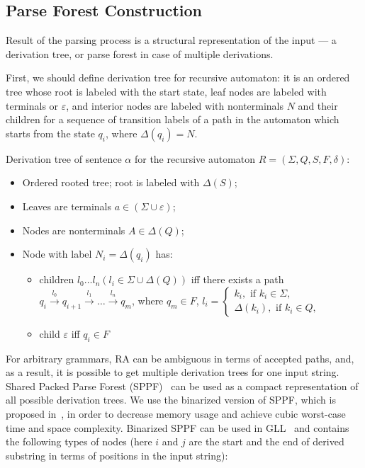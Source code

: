 \documentclass[runningheads,a4paper]{llncs}
\begin{document}
\subsection{Parse Forest Construction}

Result of the parsing process is a structural representation of the input --- a derivation tree, or parse forest in case of multiple derivations.

First, we should define derivation tree for recursive automaton: it is an ordered tree whose root is labeled with the start state,
leaf nodes are labeled with terminals or $\varepsilon$, and interior nodes are labeled with  nonterminals $N$ and their children for a sequence of transition labels of a path in the
automaton which starts from the state $q_i$, where $ \Delta(q_i) = N $.

\begin{mydef}

Derivation tree of sentence $\alpha$ for the recursive automaton $R=(\Sigma, Q, S, F, \delta)$:%

\begin{itemize}
    \item Ordered rooted tree; root is labeled with $\Delta(S)$;
    \item Leaves are terminals $a\in (\Sigma \cup \varepsilon)$;
    \item Nodes are nonterminals $A\in \Delta(Q)$;
    \item Node with label $N_i = \Delta(q_i)$ has:
    \begin{itemize}
        \item 
            children $l_0 \dots l_n (l_i \in \Sigma \cup \Delta(Q))$ iff there exists a
            path $q_i \xrightarrow[]{l_0} q_{i+1} \xrightarrow[]{l_1} \dots \xrightarrow{l_n} q_m$, where
            $q_m \in F$, $l_i = 
            \left\{
            \begin{matrix}
            k_i, \text{ if }  k_i \in \Sigma,\\
            \Delta(k_i), \text{ if } k_i \in Q,
            \end{matrix}
            \right.
            $
        \item child $\varepsilon$ iff $ q_i \in F $
    \end{itemize}
\end{itemize}
\end{mydef}

For arbitrary grammars, RA can be ambiguous in terms of accepted paths, and, as a result, it is possible to get multiple derivation trees for one input string.
Shared Packed Parse Forest (SPPF)~\cite{SPPF} can be used as a compact representation of all possible derivation trees.
We use the binarized version of SPPF, which is proposed in~\cite{brnglr}, in order to decrease memory usage and achieve cubic worst-case time and space complexity.
Binarized SPPF can be used in GLL~\cite{scott2013gll} and contains the following types of nodes (here $i$ and $j$ are the start and the end of derived substring in terms of positions in the input string):
\end{document}
